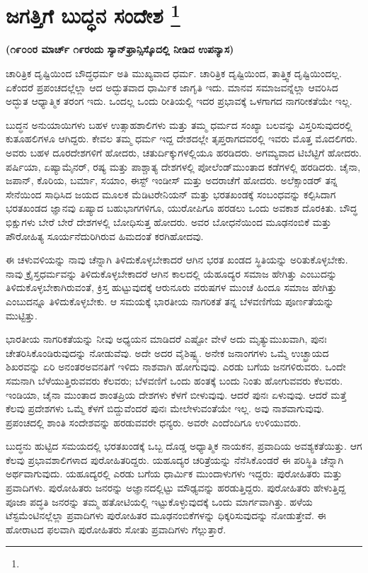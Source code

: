 
\chapter[ಜಗತ್ತಿಗೆ ಬುದ್ಧನ ಸಂದೇಶ ]{ಜಗತ್ತಿಗೆ ಬುದ್ಧನ ಸಂದೇಶ \protect\footnote{}}

\centerline{\textbf{(೧೯೦೦ರ ಮಾರ್ಚ್​ ೧೯ರಂದು ಸ್ಯಾನ್​ಫ್ರಾನ್ಸಿಸ್ಕೊದಲ್ಲಿ ನೀಡಿದ ಉಪನ್ಯಾಸ)}}

ಚಾರಿತ್ರಿಕ ದೃಷ್ಟಿಯಿಂದ ಬೌದ್ಧಧರ್ಮ ಅತಿ ಮುಖ್ಯವಾದ ಧರ್ಮ. ಚಾರಿತ್ರಿಕ ದೃಷ್ಟಿಯಿಂದ,\- ತಾತ್ತ್ವಿಕ ದೃಷ್ಟಿಯಿಂದಲ್ಲ. ಏಕೆಂದರೆ ಪ್ರಪಂಚದಲ್ಲೆಲ್ಲಾ ಆದ ಅದ್ಭುತವಾದ ಧಾರ್ಮಿಕ ಜಾಗೃತಿ ಇದು. ಮಾನವ ಸಮಾಜವನ್ನೆಲ್ಲಾ ಆವರಿಸಿದ ಅದ್ಭುತ ಆಧ್ಯಾತ್ಮಿಕ ತರಂಗ ಇದು. ಒಂದಲ್ಲ ಒಂದು ರೀತಿಯಲ್ಲಿ ಇದರ ಪ್ರಭಾವಕ್ಕೆ ಒಳಗಾಗದ ನಾಗರೀಕತೆಯೇ ಇಲ್ಲ.

ಬುದ್ಧನ ಅನುಯಾಯಿಗಳು ಬಹಳ ಉತ್ಸಾಹಶಾಲಿಗಳು ಮತ್ತು ತಮ್ಮ ಧರ್ಮದ ಸಂಖ್ಯಾ ಬಲವನ್ನು ವಿಸ್ತರಿಸುವುದರಲ್ಲಿ ಕುತೂಹಲಿಗಳೂ ಆಗಿದ್ದರು. ಕೇವಲ ತಮ್ಮ ಧರ್ಮ ಇದ್ದ ದೇಶದಲ್ಲೇ ತೃಪ್ತರಾಗದವರಲ್ಲಿ ಇವರು ಮೊತ್ತ ಮೊದಲಿಗರು. ಅವರು ಬಹಳ ದೂರದೇಶಗಳಿಗೆ ಹೋದರು, ಚತುರ್ದಿಕ್ಕುಗಳಲ್ಲಿಯೂ ಹರಡಿದರು. ಅಗಮ್ಯವಾದ ಟಿಬೆಟ್ಟಿಗೆ ಹೋದರು. ಪರ್ಷಿಯಾ, ಏಷ್ಯಾಮೈನರ್​, ರಷ್ಯ ಮತ್ತು ಪಾಶ್ಚಾತ್ಯ ದೇಶಗಳಲ್ಲಿ ಪೋಲೆಂಡ್​ ಮುಂತಾದ ಕಡೆಗಳಲ್ಲಿ ಹರಡಿದರು. ಚೈನಾ, ಜಪಾನ್​, ಕೊರಿಯ, ಬರ್ಮಾ, ಸಯಾಂ, ಈಸ್ಟ್​ ಇಂಡೀಸ್​ ಮತ್ತು ಅದರಾಚೆಗೆ ಹೋದರು. ಅಲೆಕ್ಸಾಂಡರ್​ ತನ್ನ ಸೇನೆಯಿಂದ ಸಾಧಿಸಿದ ಜಯದ ಮೂಲಕ ಮೆಡಿಟರೇನಿಯನ್​ ಮತ್ತು ಭರತಖಂಡಕ್ಕೆ ಸಂಬಂಧವನ್ನು ಕಲ್ಪಿಸಿದಾಗ ಭರತಖಂಡದ ಜ್ಞಾನವು ಏಷ್ಯಾದ ಬಹುಭಾಗಗಳಿಗೂ, ಯುರೋಪಿಗೂ ಹರಡಲು ಒಂದು ಅವಕಾಶ ದೊರಕಿತು. ಬೌದ್ಧ ಭಿಕ್ಷುಗಳು ಬೇರೆ ಬೇರೆ ದೇಶಗಳಲ್ಲಿ ಬೋಧಿಸುತ್ತ ಹೋದರು. ಅವರ ಬೋಧನೆಯಿಂದ ಮೂಢನಂಬಿಕೆ ಮತ್ತು ಪೌರೋಹಿತ್ಯ ಸೂರ್ಯನೆದುರಿಗಿರುವ ಹಿಮದಂತೆ ಕರಗಿಹೋದವು.

ಈ ಚಳುವಳಿಯನ್ನು ನಾವು ಚೆನ್ನಾಗಿ ತಿಳಿದುಕೊಳ್ಳಬೇಕಾದರೆ ಆಗಿನ ಭರತ ಖಂಡದ ಸ್ಥಿತಿಯನ್ನು ಅರಿತುಕೊಳ್ಳಬೇಕು. ನಾವು ಕ್ರೈಸ್ತಧರ್ಮವನ್ನು ತಿಳಿದುಕೊಳ್ಳಬೇಕಾದರೆ ಆಗಿನ ಕಾಲದಲ್ಲಿ ಯೆಹೂದ್ಯರ ಸಮಾಜ ಹೇಗಿತ್ತು ಎಂಬುದನ್ನು ತಿಳಿದುಕೊಳ್ಳಬೇಕಾಗಿರುವಂತೆ, ಕ್ರಿಸ್ತ ಹುಟ್ಟುವುದಕ್ಕೆ ಆರುನೂರು ವರುಷಗಳ ಮುಂಚೆ ಹಿಂದೂ ಸಮಾಜ ಹೇಗಿತ್ತು ಎಂಬುದನ್ನೂ ತಿಳಿದುಕೊಳ್ಳಬೇಕು. ಆ ಸಮಯಕ್ಕೆ ಭಾರತೀಯ ನಾಗರಿಕತೆ ತನ್ನ ಬೆಳವಣಿಗೆಯ ಪೂರ್ಣತೆಯನ್ನು ಮುಟ್ಟಿತ್ತು.

ಭಾರತೀಯ ನಾಗರಿಕತೆಯನ್ನು ನೀವು ಅಧ್ಯಯನ ಮಾಡಿದರೆ ಎಷ್ಟೋ ವೇಳೆ ಅದು ಮೃತ್ಯುಮುಖವಾಗಿ, ಪುನಃ ಚೇತರಿಸಿಕೊಂಡಿರುವುದನ್ನು ನೋಡುವೆವು. ಅದೇ ಅದರ ವೈಶಿಷ್ಟ್ಯ. ಅನೇಕ ಜನಾಂಗಗಳು ಒಮ್ಮೆ ಉಚ್ಛ್ರಾಯದ ಶಿಖರವನ್ನು ಏರಿ ಅನಂತರ\break ಅವನತಿಗೆ ಇಳಿದು ನಾಶವಾಗಿ ಹೋಗುವುವು. ಎರಡು ಬಗೆಯ ಜನಗಳಿರುವರು. ಒಂದೇ ಸಮನಾಗಿ ಬೆಳೆಯುತ್ತಿರುವವರು ಕೆಲವರು; ಬೆಳವಣಿಗೆ ಒಂದು ಹಂತಕ್ಕೆ ಬಂದು ನಿಂತು ಹೋಗುವವರು ಕೆಲವರು. ಇಂಡಿಯಾ, ಚೈನಾ ಮುಂತಾದ ಶಾಂತಪ್ರಿಯ ದೇಶಗಳು ಕೆಳಗೆ ಬೀಳುವುವು. ಆದರೆ ಪುನಃ ಏಳುವುವು. ಆದರೆ ಮತ್ತೆ ಕೆಲವು ಪ್ರದೇಶಗಳು ಒಮ್ಮೆ ಕೆಳಗೆ ಬಿದ್ದುವೆಂದರೆ ಪುನಃ ಮೇಲೇಳುವಂತೆಯೇ ಇಲ್ಲ. ಅವು ನಾಶವಾಗುವುವು. ಪ್ರಪಂಚದಲ್ಲಿ ಶಾಂತಿ ಸಂದೇಶವನ್ನು ಹರಡುವವರೇ ಧನ್ಯರು. ಅವರೇ ಎಂದೆಂದಿಗೂ ಉಳಿಯುವರು.

ಬುದ್ಧನು ಹುಟ್ಟಿದ ಸಮಯದಲ್ಲಿ ಭರತಖಂಡಕ್ಕೆ ಒಬ್ಬ ದೊಡ್ಡ ಅಧ್ಯಾತ್ಮಿಕ ನಾಯಕನ, ಪ್ರವಾದಿಯ ಅವಶ್ಯಕತೆಯಿತ್ತು. ಆಗ ಕೆಲವು ಪ್ರಭಾವಶಾಲಿಗಳಾದ ಪುರೋಹಿತರಿದ್ದರು. ಯಹೂದ್ಯರ ಚರಿತ್ರೆಯನ್ನು ನೆನೆಸಿಕೊಂಡರೆ ಈ ಪರಿಸ್ಥಿತಿ ಚೆನ್ನಾಗಿ ಅರ್ಥವಾಗುವುದು. ಯಹೂದ್ಯರಲ್ಲಿ ಎರಡು ಬಗೆಯ ಧಾರ್ಮಿಕ ಮುಂದಾಳುಗಳು ಇದ್ದರು: ಪುರೋಹಿತರು ಮತ್ತು ಪ್ರವಾದಿಗಳು. ಪುರೋಹಿತರು ಜನರನ್ನು ಅಜ್ಞಾನದಲ್ಲಿಟ್ಟು ಮೌಢ್ಯವನ್ನು ಹರಡು\-ತ್ತಿದ್ದರು. ಪುರೋಹಿತರು ಹೇಳುತ್ತಿದ್ದ ಪೂಜಾ ಪದ್ಧತಿ ಜನರನ್ನು ತಮ್ಮ ಹತೋಟಿಯಲ್ಲಿ ಇಟ್ಟುಕೊಳ್ಳುವುದಕ್ಕೆ ಒಂದು ಮಾರ್ಗವಾಗಿತ್ತು. ಹಳೆಯ ಟೆಸ್ಟಮೆಂಟಿನಲ್ಲೆಲ್ಲಾ ಪ್ರವಾದಿಗಳು ಪುರೋಹಿತರ ಮೂಢನಂಬಿಕೆಗಳನ್ನು ಧಿಕ್ಕರಿಸುವುದನ್ನು ನೋಡು\-ತ್ತೇವೆ. ಈ ಹೋರಾಟದ ಫಲವಾಗಿ ಪುರೋಹಿತರು ಸೋತು ಪ್ರವಾದಿಗಳು ಗೆಲ್ಲುತ್ತಾರೆ.

